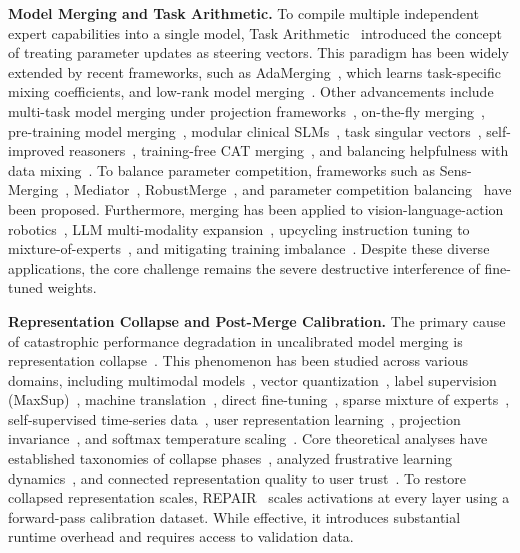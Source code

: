 \documentclass{article}
\theoremstyle{plain}
\theoremstyle{definition}
\theoremstyle{remark}
\begin{document}
\textbf{Model Merging and Task Arithmetic.}
To compile multiple independent expert capabilities into a single model, Task Arithmetic~\cite{Ilharco2022Editing} introduced the concept of treating parameter updates as steering vectors. This paradigm has been widely extended by recent frameworks, such as AdaMerging~\cite{AdamergingAdaptiveModel2023}, which learns task-specific mixing coefficients, and low-rank model merging~\cite{AccurateAndEfficient2025}. Other advancements include multi-task model merging under projection frameworks~\cite{ModelingMultitaskModel2025, WhoeverStartedThe2025}, on-the-fly merging~\cite{MergingModelsOn2025}, pre-training model merging~\cite{ModelMergingIn2025}, modular clinical SLMs~\cite{AModularApproach2025}, task singular vectors~\cite{TaskSingularVectors2024}, self-improved reasoners~\cite{SuperficialSelfimprovedReasoners2025}, training-free CAT merging~\cite{CatMergingA2025}, and balancing helpfulness with data mixing~\cite{MixDataOr2025}. To balance parameter competition, frameworks such as Sens-Merging~\cite{SensmergingSensitivityguidedParameter2025}, Mediator~\cite{MediatorMemoryefficientLlm2025}, RobustMerge~\cite{RobustmergeParameterefficientModel2025}, and parameter competition balancing~\cite{ParameterCompetitionBalancing2024} have been proposed. Furthermore, merging has been applied to vision-language-action robotics~\cite{RobustFinetuningOf2025}, LLM multi-modality expansion~\cite{MultimodalityExpansionAnd2025}, upcycling instruction tuning to mixture-of-experts~\cite{UpcyclingInstructionTuning2024}, and mitigating training imbalance~\cite{MitigatingTrainingImbalance2024}. Despite these diverse applications, the core challenge remains the severe destructive interference of fine-tuned weights.

\textbf{Representation Collapse and Post-Merge Calibration.}
The primary cause of catastrophic performance degradation in uncalibrated model merging is representation collapse~\cite{jordan2023repair}. This phenomenon has been studied across various domains, including multimodal models~\cite{ACloserLook2025, CounteringMultimodalRepresentation2025}, vector quantization~\cite{AddressingRepresentationCollapse2024}, label supervision (MaxSup)~\cite{MaxsupOvercomingRepresentation2025}, machine translation~\cite{RepresentationCollapseIn2026}, direct fine-tuning~\cite{MitigatingRepresentationCollapse2026}, sparse mixture of experts~\cite{OnTheRepresentation2022}, self-supervised time-series data~\cite{PfmlSelfsupervisedLearning2024}, user representation learning~\cite{WeAreNot2023}, projection invariance~\cite{RepresentationProjectionInvariance2022}, and softmax temperature scaling~\cite{UnpackingSoftmaxHow2025}. Core theoretical analyses have established taxonomies of collapse phases~\cite{ATaxonomyAnd2025}, analyzed frustrative learning dynamics~\cite{AMinimalModel2026}, and connected representation quality to user trust~\cite{NoRepresentationNo2024}. To restore collapsed representation scales, REPAIR~\cite{jordan2023repair} scales activations at every layer using a forward-pass calibration dataset. While effective, it introduces substantial runtime overhead and requires access to validation data.
\end{document}
